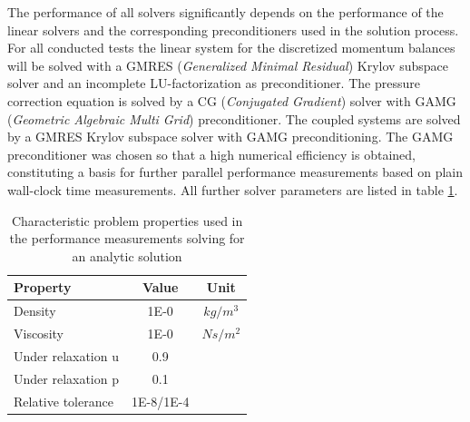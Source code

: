 The performance of all solvers significantly depends on the performance of the linear solvers and the corresponding preconditioners used in the solution process. For all conducted tests the linear system for the discretized momentum balances will be solved with a GMRES (\emph{Generalized Minimal Residual}) \cite{saad} Krylov subspace solver and an incomplete LU-factorization as preconditioner. The pressure correction equation is solved by a CG (\emph{Conjugated Gradient}) solver with GAMG (\emph{Geometric Algebraic Multi Grid}) preconditioner. The coupled systems are solved by a GMRES Krylov subspace solver with GAMG preconditioning. The GAMG preconditioner was chosen so that a high numerical efficiency is obtained, constituting a basis for further parallel performance measurements based on plain wall-clock time measurements. All further solver parameters are listed in table \ref{tab:performance}.

\begin{table}[h!]\centering
{}
  \begin{tabular}{lcc}\toprule
    Property & Value & Unit \\
    \midrule
    \rowcolor{black!20} Density    & 1E-0 & $kg/m^3$      \\
    \rowcolor{black!00} Viscosity  & 1E-0 & $Ns/m^2$  \\
    \rowcolor{black!00} Under relaxation u & 0.9 &  \\
    \rowcolor{black!20} Under relaxation p & 0.1 &  \\
    \rowcolor{black!00} Relative tolerance & 1E-8/1E-4 &
  \end{tabular}
  \caption{Characteristic problem properties used in the performance measurements solving for an analytic solution}
  \label{tab:performance}
\end{table}
 
